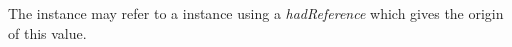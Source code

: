 The  instance may refer to a  instance using a \textit{hadReference} which gives the origin of this value. 
